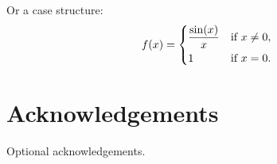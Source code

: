 \documentclass[11pt, a4paper]{article} %
\begin{document}
Or a case structure:
\[
    f(x) = \begin{dcases}
        \frac{\sin(x)}{x} & \text{if } x \neq 0, \\
        1                 & \text{if } x = 0.
    \end{dcases}
\]

\section*{Acknowledgements} %
Optional acknowledgements.

% 
% 
\end{document}
